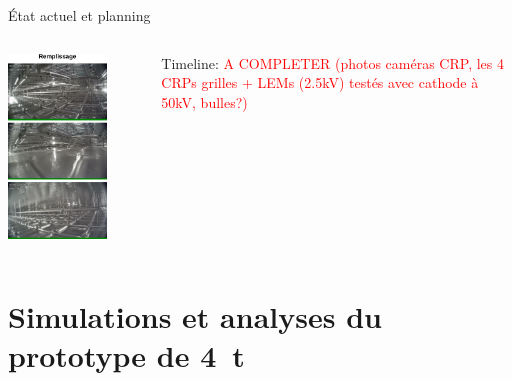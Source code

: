     \begin{frame}{État actuel et planning}
        \begin{columns}
            \begin{column}{0.5\textwidth}
                \includegraphics[width=0.75\textwidth]{./pictures/status_666.png}
            \end{column}
            \begin{column}{0.5\textwidth}
                Timeline:
                \textcolor{red}{A COMPLETER (photos caméras CRP, les 4 CRPs grilles + LEMs (2.5kV) testés avec cathode à 50kV, bulles?)}
            \end{column}
        \end{columns}
    \end{frame}

    \section[Analyse du \SI{4}{\tonne}]{Simulations et analyses du prototype de \SI{4}{\tonne}}
    
